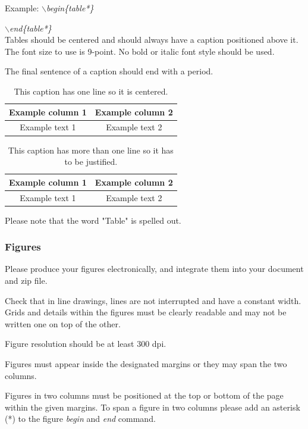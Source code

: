 \documentclass[a4paper,twoside]{article}
\begin{document}
Example: \textit{$\backslash$begin\{table*\}}

\hspace*{1.5cm}\textit{$\backslash$end\{table*\}}\\

Tables should be centered and should always have a caption
positioned above it. The font size to use is 9-point. No bold or
italic font style should be used.

The final sentence of a caption should end with a period.

\begin{table}[h]
\caption{This caption has one line so it is
centered.}\label{tab:example1} \centering
\begin{tabular}{|c|c|}
  \hline
  Example column 1 & Example column 2 \\
  \hline
  Example text 1 & Example text 2 \\
  \hline
\end{tabular}
\end{table}

\begin{table}[h]
\caption{This caption has more than one line so it has to be
justified.}\label{tab:example2} \centering
\begin{tabular}{|c|c|}
  \hline
  Example column 1 & Example column 2 \\
  \hline
  Example text 1 & Example text 2 \\
  \hline
\end{tabular}
\end{table}

Please note that the word "Table" is spelled out.


\subsubsection{Figures}

Please produce your figures electronically, and integrate them into
your document and zip file.

Check that in line drawings, lines are not interrupted and have a
constant width. Grids and details within the figures must be clearly
readable and may not be written one on top of the other.

Figure resolution should be at least 300 dpi.

Figures must appear inside the designated margins or they may span
the two columns.

Figures in two columns must be positioned at the top or bottom of
the page within the given margins. To span a figure in two columns please add an asterisk (*) to the figure \textit{begin} and \textit{end} command.
\end{document}
